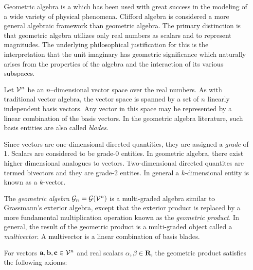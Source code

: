 \documentclass[12pt]{article}
\begin{document}
Geometric algebra is a  which has been used with great success in the modeling of a wide variety of physical phenomena.  Clifford algebra is considered a more general algebraic framework than geometric algebra.  The primary distinction is that geometric algebra utilizes only real numbers as scalars and to represent magnitudes.  The underlying philosophical justification for this is the interpretation that the unit imaginary has geometric significance which naturally arises from the properties of the algebra and the interaction of its various subspaces.

Let ${\cal{V}}^n$ be an $n$--dimensional vector space over the real numbers.  As with traditional vector algebra, the vector space is spanned by a set of $n$ linearly independent basis vectors.  Any vector in this space may be represented by a linear combination of the basis vectors.  In the geometric algebra literature, such basis entities are also called \emph{blades}.

Since vectors are one-dimensional directed quantities, they are assigned a \emph{grade} of 1.  Scalars are considered to be grade-0 entities.  In geometric algebra, there exist higher dimensional analogues to vectors.  Two-dimensional directed quantites are termed bivectors and they are grade-2 entites.  In general a $k$-dimensional entity is known as a $k$-vector.

The \emph{geometric algebra} ${\cal{G}}_n={\cal{G}}({\cal{V}}^n)$ is a multi-graded algebra similar to Grassmann's exterior algebra, except that the exterior product is replaced by a more fundamental multiplication operation known as the \emph{geometric product}.  In general, the result of the geometric product is a multi-graded object called a \emph{multivector}.  A multivector is a linear combination of basis blades.

For vectors $\mathbf{a}, \mathbf{b}, \mathbf{c} \in {\cal{V}}^n$ and real scalars $\alpha, \beta \in \mathbf{R}$, the geometric product satisfies the following axioms:
\end{document}
